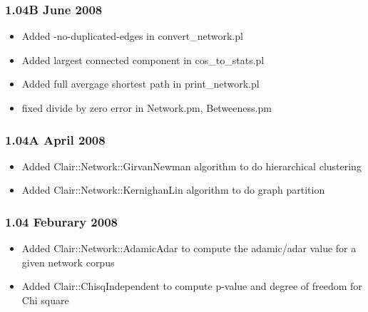 \subsubsection*{1.04B June 2008\label{1_04B_June_2008}}
\begin{itemize}

\item 

Added -no-duplicated-edges in convert\_network.pl


\item Added largest connected component in cos\_to\_stats.pl
\item Added full avergage shortest path in print\_network.pl
\item 

fixed divide by zero error in Network.pm, Betweeness.pm

\end{itemize}
\subsubsection*{1.04A April 2008\label{1_04A_April_2008}}
\begin{itemize}

\item 

Added Clair::Network::GirvanNewman algorithm to do hierarchical clustering


\item 

Added Clair::Network::KernighanLin algorithm to do graph partition

\end{itemize}
\subsubsection*{1.04 Feburary 2008\label{1_04_Feburary_2008}}
\begin{itemize}

\item 

Added Clair::Network::AdamicAdar to compute the adamic/adar value for a given network corpus


\item 

Added Clair::ChisqIndependent to compute p-value and degree of freedom for Chi square

\end{itemize}

